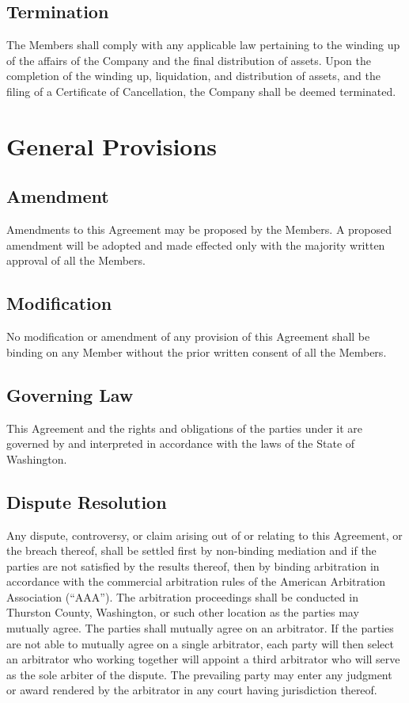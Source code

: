 \documentclass[11pt,onecolumn]{article}
\begin{document}
\subsection{Termination}

The Members shall comply with any applicable law pertaining to the winding up of the affairs of the Company and the final distribution of assets. Upon the completion of the winding up, liquidation, and distribution of assets, and the filing of a Certificate of Cancellation, the Company shall be deemed terminated.

\section{General Provisions}

\subsection{Amendment}

Amendments to this Agreement may be proposed by the Members. A proposed amendment will be adopted and made effected only with the majority written approval of all the Members.

\subsection{Modification}

No modification or amendment of any provision of this Agreement shall be binding on any Member without the prior written consent of all the Members.

\subsection{Governing Law}

This Agreement and the rights and obligations of the parties under it are governed by and interpreted in accordance with the laws of the State of Washington.

\subsection{Dispute Resolution}

Any dispute, controversy, or claim arising out of or relating to this Agreement, or the breach thereof, shall be settled first by non-binding mediation and if the parties are not satisfied by the results thereof, then by binding arbitration in accordance with the commercial arbitration rules of the American Arbitration Association (``AAA''). The arbitration proceedings shall be conducted in Thurston County, Washington, or such other location as the parties may mutually agree. The parties shall mutually agree on an arbitrator. If the parties are not able to mutually agree on a single arbitrator, each party will then select an arbitrator who working together will appoint a third arbitrator who will serve as the sole arbiter of the dispute. The prevailing party may enter any judgment or award rendered by the arbitrator in any court having jurisdiction thereof.
\end{document}
